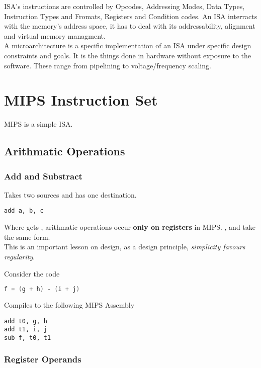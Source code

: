 \documentclass[11pt,a4paper,twocolumn]{book}
\begin{document}
ISA's instructions are controlled by Opcodes, Addressing Modes, Data Types, Instruction Types and Fromats, Registers and Condition codes. An ISA interracts with the memory's address space, it has to deal with its addressability, alignment and virtual memory managment.\\

A microarchitecture is a specific implementation of an ISA under specific design constraints and goals. It is the things done in hardware without exposure to the software. These range from pipelining to voltage/frequency scaling.

\section{MIPS Instruction Set}

MIPS is a simple ISA.

\subsection{Arithmatic Operations}

\subsubsection{Add and Substract}

Takes two sources and has one destination.

\begin{lstlisting}
add a, b, c
\end{lstlisting}

Where  gets , arithmatic operations occur \textbf{only on registers} in MIPS. ,  and  take the same form.\\

This is an important lesson on design, as a design principle, \textit{simplicity favours regularity}.

Consider the code

\begin{lstlisting}[language=C]
f = (g + h) - (i + j)
\end{lstlisting}

Compiles to the following MIPS Assembly

\begin{lstlisting}
add t0, g, h
add t1, i, j
sub f, t0, t1
\end{lstlisting}

\subsubsection{Register Operands}
\end{document}

